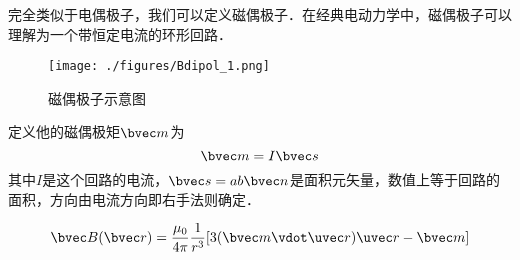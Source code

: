 
\begin{issues}
\issueDraft
\end{issues}
完全类似于电偶极子，我们可以定义磁偶极子．在经典电动力学中，磁偶极子可以理解为一个带恒定电流的环形回路．
\begin{figure}[ht]
\centering
\texttt{[image: ./figures/Bdipol\_1.png]}
\caption{磁偶极子示意图} \label{Bdipol_fig1}
\end{figure}

定义他的磁偶极矩$\bvec m$为
\begin{equation}
\bvec m = I \bvec s
\end{equation}
其中$I$是这个回路的电流，$\bvec s = ab\bvec n$是面积元矢量，数值上等于回路的面积，方向由电流方向即右手法则确定．

\begin{equation}
\bvec B(\bvec r) = \frac{\mu_0}{4\pi} \frac{1}{r^3} [3(\bvec m \vdot \uvec r) \uvec r - \bvec m]
\end{equation}
